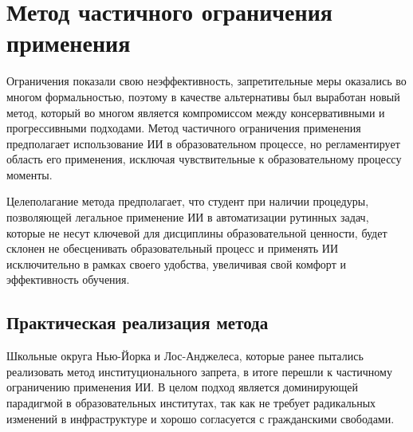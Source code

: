 \documentclass[12pt,a4paper]{article}
\begin{document}
\section{Метод частичного ограничения применения}

Ограничения показали свою неэффективность, запретительные меры оказались во многом 
формальностью, поэтому в качестве альтернативы был выработан новый метод, который во 
многом является компромиссом между консервативными и прогрессивными подходами. 
Метод частичного ограничения применения предполагает использование ИИ в 
образовательном процессе, но регламентирует область его применения, исключая 
чувствительные к образовательному процессу моменты. 

Целеполагание метода предполагает, 
что студент при наличии процедуры, позволяющей легальное применение ИИ в автоматизации 
рутинных задач, которые не несут ключевой для дисциплины образовательной ценности, 
будет склонен не обесценивать образовательный процесс и применять ИИ исключительно 
в рамках своего удобства, увеличивая свой комфорт и эффективность обучения.

\subsection{Практическая реализация метода}

Школьные округа Нью-Йорка и Лос-Анджелеса, которые ранее пытались реализовать метод 
институционального запрета, в итоге перешли к частичному ограничению применения ИИ.
В целом подход является доминирующей парадигмой в образовательных институтах, так 
как не требует радикальных изменений в инфраструктуре и хорошо согласуется с 
гражданскими свободами.
\end{document}
